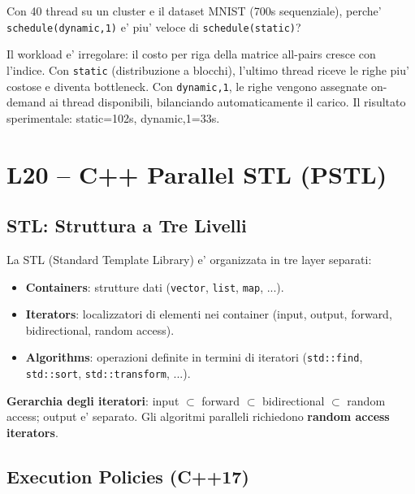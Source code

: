 \documentclass[11pt,a4paper]{article}
\theoremstyle{remark}
\newenvironment{esercizio}[1][]{%
  \begin{tcolorbox}[breakable,title={\textbf{Esercizio / Domanda d'esame}\ifx&#1&\else: #1\fi},
    colback=yellow!5!white, colframe=orange!75!black, fonttitle=\small\bfseries]%
}{%
  \end{tcolorbox}%
}
\newenvironment{risposta}{%
  \begin{tcolorbox}[breakable,title={\textbf{Risposta}},
    colback=green!5!white, colframe=green!50!black, fonttitle=\small\bfseries]%
}{%
  \end{tcolorbox}%
}
\begin{document}
\begin{esercizio}
Con 40 thread su un cluster e il dataset MNIST (700s sequenziale), perche' \lstinline|schedule(dynamic,1)| e' piu' veloce di \lstinline|schedule(static)|?
\end{esercizio}
\begin{risposta}
Il workload e' irregolare: il costo per riga della matrice all-pairs cresce con l'indice. Con \lstinline|static| (distribuzione a blocchi), l'ultimo thread riceve le righe piu' costose e diventa bottleneck. Con \lstinline|dynamic,1|, le righe vengono assegnate on-demand ai thread disponibili, bilanciando automaticamente il carico. Il risultato sperimentale: static=102s, dynamic,1=33s.
\end{risposta}

\section{L20 -- C++ Parallel STL (PSTL)}

\subsection{STL: Struttura a Tre Livelli}

La STL (Standard Template Library) e' organizzata in tre layer separati:
\begin{itemize}
  \item \textbf{Containers}: strutture dati (\lstinline|vector|, \lstinline|list|, \lstinline|map|, ...).
  \item \textbf{Iterators}: localizzatori di elementi nei container (input, output, forward, bidirectional, random access).
  \item \textbf{Algorithms}: operazioni definite in termini di iteratori (\lstinline|std::find|, \lstinline|std::sort|, \lstinline|std::transform|, ...).
\end{itemize}

\textbf{Gerarchia degli iteratori}: input $\subset$ forward $\subset$ bidirectional $\subset$ random access; output e' separato. Gli algoritmi paralleli richiedono \textbf{random access iterators}.

\subsection{Execution Policies (C++17)}
\end{document}
